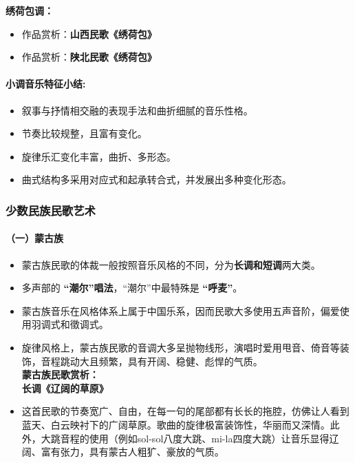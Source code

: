 \documentclass[
]{article}
\providecommand{\tightlist}{%
  \setlength{\itemsep}{0pt}\setlength{\parskip}{0pt}}
\begin{document}
\textbf{绣荷包调：}

\begin{itemize}
\tightlist
\item
  作品赏析：\textbf{山西民歌《绣荷包》}
\item
  作品赏析：\textbf{陕北民歌《绣荷包》}
\end{itemize}

\paragraph{小调音乐特征小结:}\label{ux5c0fux8c03ux97f3ux4e50ux7279ux5f81ux5c0fux7ed3}

\begin{itemize}
\tightlist
\item
  叙事与抒情相交融的表现手法和曲折细腻的音乐性格。
\item
  节奏比较规整，且富有变化。
\item
  旋律乐汇变化丰富，曲折、多形态。
\item
  曲式结构多采用对应式和起承转合式，并发展出多种变化形态。
\end{itemize}

\subsubsection{少数民族民歌艺术}\label{ux5c11ux6570ux6c11ux65cfux6c11ux6b4cux827aux672f}

\paragraph{（一）蒙古族}\label{ux4e00ux8499ux53e4ux65cf}

\begin{itemize}
\tightlist
\item
  蒙古族民歌的体裁一般按照音乐风格的不同，分为\textbf{长调和短调}两大类。
\item
  多声部的 \textbf{``潮尔''唱法}，``潮尔''中最特殊是 \textbf{``呼麦''}。
\item
  蒙古族音乐在风格体系上属于中国乐系，因而民歌大多使用五声音阶，偏爱使用羽调式和徵调式。
\item
  旋律风格上，蒙古族民歌的音调大多呈抛物线形，演唱时爱用甩音、倚音等装饰，音程跳动大且频繁，具有开阔、稳健、彪悍的气质。\\
  \textbf{蒙古族民歌赏析：}\\
  \textbf{长调《辽阔的草原》}
\item
  这首民歌的节奏宽广、自由，在每一句的尾部都有长长的拖腔，仿佛让人看到蓝天、白云映衬下的广阔草原。歌曲的旋律极富装饰性，华丽而又深情。此外，大跳音程的使用（例如sol-sol八度大跳、mi-la四度大跳）让音乐显得辽阔、富有张力，具有蒙古人粗犷、豪放的气质。
\end{itemize}
\end{document}
